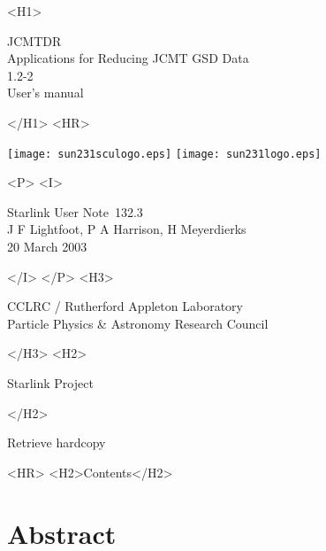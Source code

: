 \documentclass[twoside,11pt]{article}
\newcommand{\stardoccategory}  {Starlink User Note}
\newcommand{\stardocsource}    {sun\stardocnumber}
\newcommand{\stardocnumber}    {132.3}
\newcommand{\stardocauthors}
   {J F Lightfoot, P A Harrison, H Meyerdierks}
\newcommand{\stardocdate}      {20 March 2003}
\newcommand{\stardoctitle}     {JCMTDR \\[2ex] Applications for Reducing JCMT GSD Data}
\newcommand{\stardocversion}   {1.2-2}
\newcommand{\stardocmanual}    {User's manual}
\newcommand{\htmladdnormallink}[2]{#1}
\newcommand{\htmladdimg}[1]{}
\newcommand{\htmlref}[2]{#1}
\newcommand{\htmladdtonavigation}[1]{}
\newcommand{\xlabel}[1]{}
\renewcommand{\_}{\texttt{\symbol{95}}}
\begin{document}
\begin{htmlonly}
   \xlabel{}
   \begin{rawhtml} <H1> \end{rawhtml}
      \stardoctitle\\
      \stardocversion\\
      \stardocmanual
   \begin{rawhtml} </H1> <HR> \end{rawhtml}

\texttt{[image: sun231\_sculogo.eps]}
\texttt{[image: sun231\_logo.eps]}

   \begin{rawhtml} <P> <I> \end{rawhtml}
   \stardoccategory\ \stardocnumber \\
   \stardocauthors \\
   \stardocdate
   \begin{rawhtml} </I> </P> <H3> \end{rawhtml}
      \htmladdnormallink{CCLRC / Rutherford Appleton Laboratory}
                        {http://www.cclrc.ac.uk} \\
      \htmladdnormallink{Particle Physics \& Astronomy Research Council}
                        {http://www.pparc.ac.uk} \\
   \begin{rawhtml} </H3> <H2> \end{rawhtml}
      \htmladdnormallink{Starlink Project}{http://www.starlink.rl.ac.uk/}
   \begin{rawhtml} </H2> \end{rawhtml}
   \htmladdnormallink{\htmladdimg{source.gif} Retrieve hardcopy}
      {http://www.starlink.rl.ac.uk/cgi-bin/hcserver?\stardocsource}\\

  \label{stardoccontents}
  \begin{rawhtml} 
    <HR>
    <H2>Contents</H2>
  \end{rawhtml}
  \htmladdtonavigation{\htmlref{\htmladdimg{contents_motif.gif}}
        {stardoccontents}}

  \section{\xlabel{abstract}Abstract}
\end{htmlonly}
\end{document}
